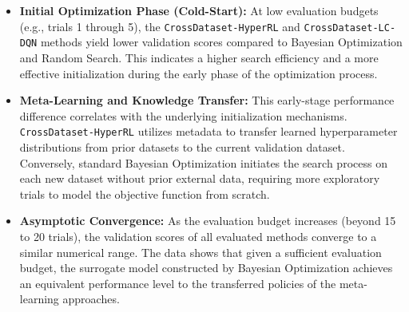 \begin{itemize}
    \item \textbf{Initial Optimization Phase (Cold-Start):} At low evaluation budgets (e.g., trials 1 through 5), the \texttt{CrossDataset-HyperRL} and \texttt{CrossDataset-LC-DQN} methods yield lower validation scores compared to Bayesian Optimization and Random Search. This indicates a higher search efficiency and a more effective initialization during the early phase of the optimization process.
    \item \textbf{Meta-Learning and Knowledge Transfer:} This early-stage performance difference correlates with the underlying initialization mechanisms. \texttt{CrossDataset-HyperRL} utilizes metadata to transfer learned hyperparameter distributions from prior datasets to the current validation dataset. Conversely, standard Bayesian Optimization initiates the search process on each new dataset without prior external data, requiring more exploratory trials to model the objective function from scratch.
    \item \textbf{Asymptotic Convergence:} As the evaluation budget increases (beyond 15 to 20 trials), the validation scores of all evaluated methods converge to a similar numerical range. The data shows that given a sufficient evaluation budget, the surrogate model constructed by Bayesian Optimization achieves an equivalent performance level to the transferred policies of the meta-learning approaches.
\end{itemize}


